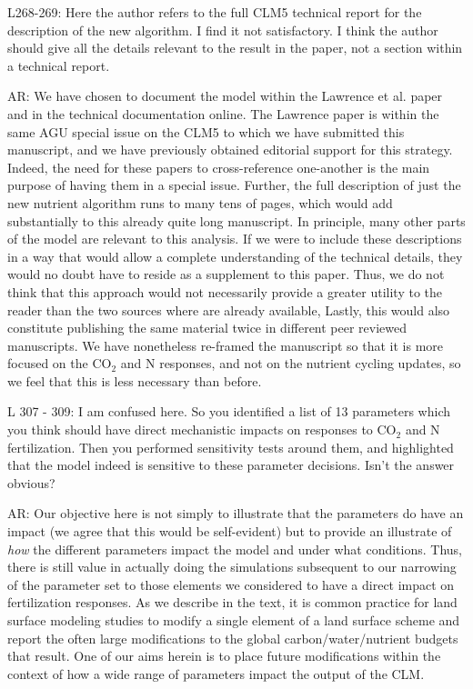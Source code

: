 \documentclass{article}
\begin{document}
L268-269: Here the author refers to the full CLM5 technical report for the description of the new algorithm. I find it not satisfactory. I think the author should give all the details relevant to the result in the paper, not a section within a technical report. 

\textsf{AR: We have chosen to document the model within the Lawrence et al. paper and in the technical documentation online. The Lawrence paper is within the same AGU special issue on the CLM5 to which we have submitted this manuscript, and we have previously obtained editorial support for this strategy. Indeed, the need for these papers to cross-reference one-another is the main purpose of having them in a special issue.  Further, the full description of just the new nutrient algorithm runs to many tens of pages, which would add substantially to this already quite long manuscript.  In principle, many other parts of the model are relevant to this analysis. If we were to include these descriptions in a way that would allow a complete understanding of the technical details, they would no doubt have to reside as a supplement to this paper. Thus, we do not think that this approach would not necessarily provide a greater utility to the reader than the two sources where are already available, Lastly, this would also constitute publishing the same material twice in different peer reviewed manuscripts.  We have nonetheless re-framed the manuscript so that it is more focused on the CO$_{2}$ and N responses, and not on the nutrient cycling updates, so we feel that this is less necessary than before.}

L 307 - 309: I am confused here. So you identified a list of 13 parameters which you think should have direct mechanistic impacts on responses to CO$_{2}$ and N fertilization. Then you performed sensitivity tests around them, and highlighted that the model indeed is sensitive to these parameter decisions. Isn't the answer obvious? 

\textsf{AR: Our objective here is not simply to illustrate that the parameters do have an impact (we agree that this would be self-evident) but to provide an illustrate of \emph{how} the different parameters impact the model and under what conditions.  Thus, there is still value in actually doing the simulations subsequent to our narrowing of the parameter set to those elements we considered to have a direct impact on fertilization responses. As we describe in the text, it is common practice for land surface modeling studies to modify a single element of a land surface scheme and report the often large modifications to the global carbon/water/nutrient budgets that result. One of our aims herein is to place future modifications within the context of how a wide range of parameters impact the output of the CLM.}
\end{document}
